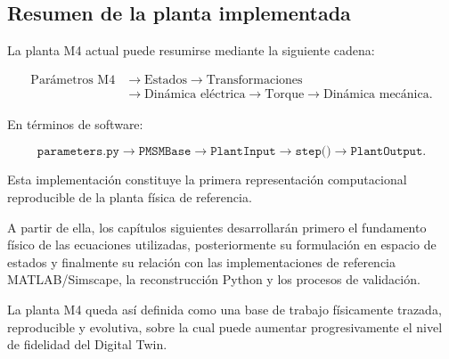 \subsection{Resumen de la planta implementada}

La planta M4 actual puede resumirse mediante la siguiente cadena:

\begin{equation}
\begin{aligned}
\text{Parámetros M4}
&\rightarrow \text{Estados}
\rightarrow \text{Transformaciones}
\\
&\rightarrow \text{Dinámica eléctrica}
\rightarrow \text{Torque}
\rightarrow \text{Dinámica mecánica}.
\end{aligned}
\end{equation}

En términos de software:

\begin{equation}
\texttt{parameters.py}
\rightarrow
\texttt{PMSMBase}
\rightarrow
\texttt{PlantInput}
\rightarrow
\texttt{step()}
\rightarrow
\texttt{PlantOutput}.
\end{equation}

Esta implementación constituye la primera representación computacional reproducible de la planta física de referencia.

A partir de ella, los capítulos siguientes desarrollarán primero el fundamento físico de las ecuaciones utilizadas, posteriormente su formulación en espacio de estados y finalmente su relación con las implementaciones de referencia MATLAB/Simscape, la reconstrucción Python y los procesos de validación.

La planta M4 queda así definida como una base de trabajo físicamente trazada, reproducible y evolutiva, sobre la cual puede aumentar progresivamente el nivel de fidelidad del Digital Twin.

